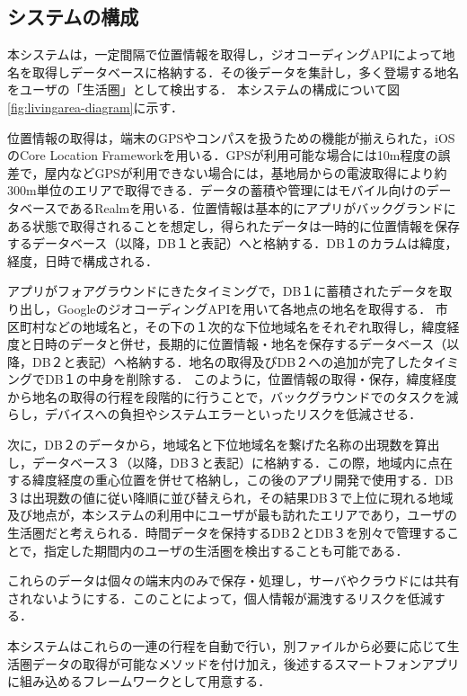 \documentclass[a4paper]{jsarticle}
\begin{document}
\subsection{システムの構成}
本システムは，一定間隔で位置情報を取得し，ジオコーディングAPIによって地名を取得しデータベースに格納する．その後データを集計し，多く登場する地名をユーザの「生活圏」として検出する．
本システムの構成について図\ref{fig:livingarea-diagram}に示す．

位置情報の取得は，端末のGPSやコンパスを扱うための機能が揃えられた，iOSのCore Location Frameworkを用いる．GPSが利用可能な場合には10m程度の誤差で，屋内などGPSが利用できない場合には，基地局からの電波取得により約300m単位のエリアで取得できる．データの蓄積や管理にはモバイル向けのデータベースであるRealmを用いる．位置情報は基本的にアプリがバックグランドにある状態で取得されることを想定し，得られたデータは一時的に位置情報を保存するデータベース（以降，DB１と表記）へと格納する．DB１のカラムは緯度，経度，日時で構成される．

アプリがフォアグラウンドにきたタイミングで，DB１に蓄積されたデータを取り出し，GoogleのジオコーディングAPIを用いて各地点の地名を取得する．
市区町村などの地域名と，その下の１次的な下位地域名をそれぞれ取得し，緯度経度と日時のデータと併せ，長期的に位置情報・地名を保存するデータベース（以降，DB２と表記）へ格納する．地名の取得及びDB２への追加が完了したタイミングでDB１の中身を削除する．
このように，位置情報の取得・保存，緯度経度から地名の取得の行程を段階的に行うことで，バックグラウンドでのタスクを減らし，デバイスへの負担やシステムエラーといったリスクを低減させる．

次に，DB２のデータから，地域名と下位地域名を繋げた名称の出現数を算出し，データベース３（以降，DB３と表記）に格納する．この際，地域内に点在する緯度経度の重心位置を併せて格納し，この後のアプリ開発で使用する．DB３は出現数の値に従い降順に並び替えられ，その結果DB３で上位に現れる地域及び地点が，本システムの利用中にユーザが最も訪れたエリアであり，ユーザの生活圏だと考えられる．時間データを保持するDB２とDB３を別々で管理することで，指定した期間内のユーザの生活圏を検出することも可能である．

これらのデータは個々の端末内のみで保存・処理し，サーバやクラウドには共有されないようにする．このことによって，個人情報が漏洩するリスクを低減する．

本システムはこれらの一連の行程を自動で行い，別ファイルから必要に応じて生活圏データの取得が可能なメソッドを付け加え，後述するスマートフォンアプリに組み込めるフレームワークとして用意する．
\end{document}
